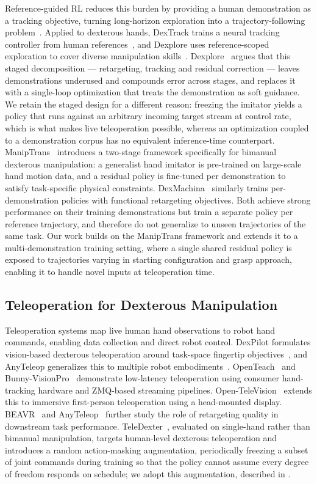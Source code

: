 Reference-guided RL reduces this burden by providing a human demonstration as a
tracking objective, turning long-horizon exploration into a trajectory-following
problem~\cite{deepmimic}.
Applied to dexterous hands, DexTrack trains a neural tracking controller from
human references~\cite{dextrack}, and Dexplore uses reference-scoped
exploration to cover diverse manipulation skills~\cite{dexplore}.
Dexplore~\cite{dexplore} argues that this staged decomposition --- retargeting, tracking and
residual correction --- leaves demonstrations underused and compounds error across stages, and
replaces it with a single-loop optimization that treats the demonstration as soft guidance.
We retain the staged design for a different reason: freezing the imitator yields a policy that
runs against an arbitrary incoming target stream at control rate, which is what makes live
teleoperation possible, whereas an optimization coupled to a demonstration corpus has no
equivalent inference-time counterpart.
ManipTrans~\cite{maniptrans} introduces a two-stage framework specifically for
bimanual dexterous manipulation: a generalist hand imitator is pre-trained on
large-scale hand motion data, and a residual policy is fine-tuned per demonstration
to satisfy task-specific physical constraints.
DexMachina~\cite{dexmachina} similarly trains per-demonstration policies with
functional retargeting objectives.
Both achieve strong performance on their training demonstrations but train a separate
policy per reference trajectory, and therefore do not generalize to unseen trajectories
of the same task.
Our work builds on the ManipTrans framework and extends it to a multi-demonstration
training setting, where a single shared residual policy is exposed to trajectories
varying in starting configuration and grasp approach, enabling it to handle novel
inputs at teleoperation time.
 
\subsection{Teleoperation for Dexterous Manipulation}
\label{sec:related-teleop}
 
Teleoperation systems map live human hand observations to robot hand commands, enabling
data collection and direct robot control.
DexPilot formulates vision-based dexterous teleoperation around task-space fingertip
objectives~\cite{dexpilot}, and AnyTeleop generalizes this to multiple robot
embodiments~\cite{anyteleop}.
OpenTeach~\cite{openteach} and Bunny-VisionPro~\cite{bunnyvisionpro} demonstrate low-latency
teleoperation using consumer hand-tracking hardware and ZMQ-based streaming pipelines.
Open-TeleVision~\cite{opentv} extends this to immersive first-person teleoperation using a
head-mounted display.
BEAVR~\cite{beavr} and AnyTeleop~\cite{anyteleop} further study the role of retargeting
quality in downstream task performance.
TeleDexter~\cite{teledexter}, evaluated on single-hand rather than bimanual manipulation,
targets human-level dexterous teleoperation and introduces a
random action-masking augmentation, periodically freezing a subset of joint commands during
training so that the policy cannot assume every degree of freedom responds on schedule; we
adopt this augmentation, described in .
 
